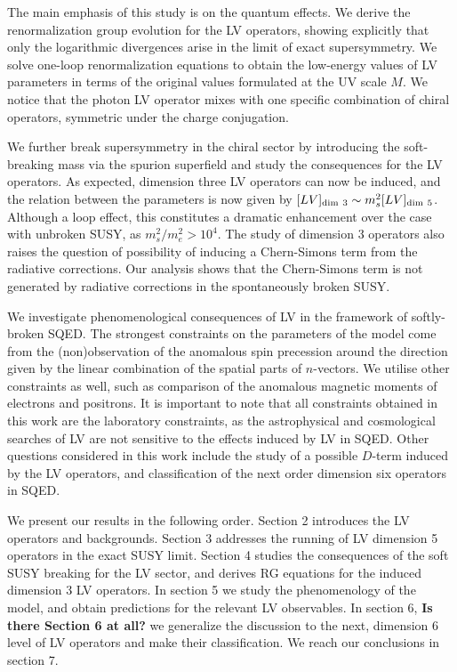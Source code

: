 \documentclass[12pt]{revtex4}
\begin{document}
The main emphasis of this study is on the quantum effects. We derive the
renormalization group evolution for the LV operators, showing
explicitly that only the logarithmic divergences arise in the limit of
exact supersymmetry. We solve  one-loop renormalization equations
to obtain the low-energy values of LV parameters in terms of the
original values formulated at the UV scale $M$. We notice that the
photon LV operator mixes with one specific combination of  
chiral operators, symmetric under the charge conjugation. 

We further break supersymmetry in the chiral sector by introducing the 
soft-breaking mass via the spurion superfield and study the consequences for the 
LV operators. As expected, dimension three LV operators can now be induced, and the 
relation between the parameters is now given by 
$[LV]_{\rm dim~3} \sim m_{s}^2 [LV]_{\rm dim~5}$. 
Although a loop effect, this constitutes a dramatic enhancement over
the case with unbroken SUSY, as $ m_{s}^2/m_e^2 > 10^4$.  
The study of dimension 3 operators also raises the question of possibility of 
inducing  a Chern-Simons term from the radiative corrections.
Our analysis shows that the Chern-Simons term is not generated by 
radiative corrections in the spontaneously broken SUSY.

We investigate phenomenological consequences of LV in the framework of
softly-broken SQED. The strongest constraints on the parameters of the
model come from the  (non)observation of the anomalous spin precession
around the direction given by the linear combination of the spatial
parts of $n$-vectors. We utilise other constraints as well,  
such as comparison of the anomalous magnetic moments of electrons and 
positrons. It is important to note that all constraints obtained in this 
work are the laboratory constraints, as the astrophysical and cosmological 
searches of LV are not sensitive to the effects induced by LV in SQED. 
Other questions considered in this work include the study of a possible $D$-term 
induced by the LV operators, and classification of the next order
dimension six operators in SQED. 

We present our results in the following order. Section 2 introduces
the LV operators and backgrounds. Section 3 addresses the running of
LV dimension 5 operators in the exact SUSY limit. Section 4 studies
the consequences of the soft SUSY breaking for the LV sector, and
derives RG equations for the induced dimension 3 LV operators.  In
section 5 we study the phenomenology of the model, and obtain 
predictions for the relevant LV observables. In section 6, 
{\bf Is there Section 6 at all?}
we
generalize the discussion to the next, dimension 6 level of LV
operators and make their classification. We reach our conclusions in
section 7.  
\end{document}
